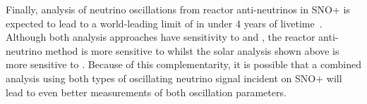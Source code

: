 Finally, analysis of neutrino oscillations from reactor anti-neutrinos in SNO+ is expected to lead to a world-leading limit of \dmsq{} in under 4 years of livetime~\cite{morton-blakeFirstMeasurementReactor2021}. Although both analysis approaches have sensitivity to \dmsq{} and \tonetwo{}, the reactor anti-neutrino method is more sensitive to \dmsq{} whilst the solar analysis shown above is more sensitive to \tonetwo{}. Because of this complementarity, it is possible that a combined analysis using both types of oscillating neutrino signal incident on SNO+ will lead to even better measurements of both oscillation parameters.



